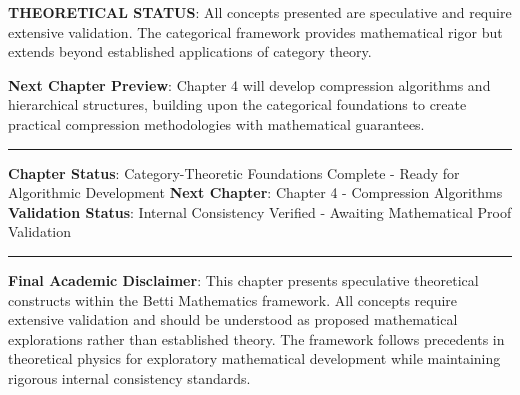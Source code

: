 \textbf{THEORETICAL STATUS}: All concepts presented are speculative and require extensive validation. The categorical framework provides mathematical rigor but extends beyond established applications of category theory.

\textbf{Next Chapter Preview}: Chapter 4 will develop compression algorithms and hierarchical structures, building upon the categorical foundations to create practical compression methodologies with mathematical guarantees.

\hrule

\textbf{Chapter Status}: Category-Theoretic Foundations Complete - Ready for Algorithmic Development  
\textbf{Next Chapter}: Chapter 4 - Compression Algorithms  
\textbf{Validation Status}: Internal Consistency Verified - Awaiting Mathematical Proof Validation

\hrule

\textbf{Final Academic Disclaimer}: This chapter presents speculative theoretical constructs within the Betti Mathematics framework. All concepts require extensive validation and should be understood as proposed mathematical explorations rather than established theory. The framework follows precedents in theoretical physics for exploratory mathematical development while maintaining rigorous internal consistency standards.